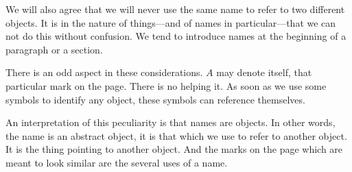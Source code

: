 

We will also agree that we will never use the same name to refer to two different objects.
It is in the nature of things---and of names in particular---that we can not do this without confusion.
We tend to introduce names at the beginning of a paragraph or a section.


There is an odd aspect in these considerations.
$A$ may denote itself, that particular mark on the page.
There is no helping it.
As soon as we use some symbols to identify any object, these symbols can reference themselves.

An interpretation of this peculiarity is that names are objects.
In other words, the name is an abstract object, it is that which we use to refer to another object.
It is the thing pointing to another object.
And the marks on the page which are meant to look similar are the several uses of a name.

